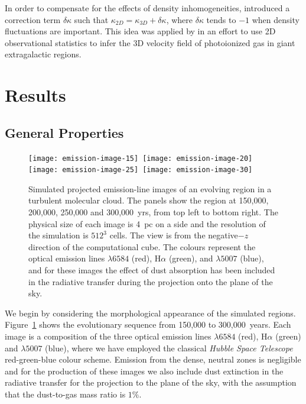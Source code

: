 \documentclass[useAMS,usenatbib]{mn2e}
\begin{document}
In order to compensate for the effects of density inhomogeneities,
\citet {2004ApJ...604..196B} introduced a correction term $\delta\kappa$
such that $\kappa_{2D} = \kappa_{3D} + \delta\kappa$, where
$\delta\kappa$ tends to $-1$ when density fluctuations are
important. This idea was applied by \citet{2011MNRAS.413..721L}  in an
effort to use 2D observational statistics to infer the 3D velocity
field of photoionized gas in giant extragalactic \hii{} regions.

\section[]{Results}
\label{sec:results}
\subsection{General Properties}
\label{subsec:genprop}
\begin{figure}
\centering
\texttt{[image: emission-image-15]}~\texttt{[image: emission-image-20]}\\
\texttt{[image: emission-image-25]}~\texttt{[image: emission-image-30]}
\caption{Simulated projected emission-line images of an evolving \hii{} region in a
turbulent molecular cloud. The panels show the \hii{} region at 150,000,
200,000, 250,000 and 300,000~yrs, from top left to bottom right. The
physical size of each image is 4~pc on a side and the resolution of
the simulation is $512^3$ cells. The view is from the negative$-z$
direction of the computational cube. The colours represent the optical
emission lines \nii$\lambda 6584$ (red), H$\alpha$ (green), and
\oiii$\lambda 5007$ (blue), and for these images the effect of dust
absorption has been included in the radiative transfer during the
projection onto the plane of the sky. }
\label{fig:HIIimages}
\end{figure}

We begin by considering the morphological appearance of the simulated
\hii{} regions. Figure~\ref{fig:HIIimages} shows the evolutionary
sequence from 150,000 to 300,000~years. Each image is a composition of
the three optical emission lines \nii$\lambda 6584$ (red), H$\alpha$
(green) and \oiii$\lambda 5007$ (blue), where we have employed the
classical \textit{Hubble Space Telescope} red-green-blue colour
scheme. Emission from the dense, neutral zones is negligible and for
the production of these images we
also include dust extinction in the radiative transfer for the
projection to the plane of the sky, with the assumption that the
dust-to-gas mass ratio is $1 \%$. 
\end{document}
